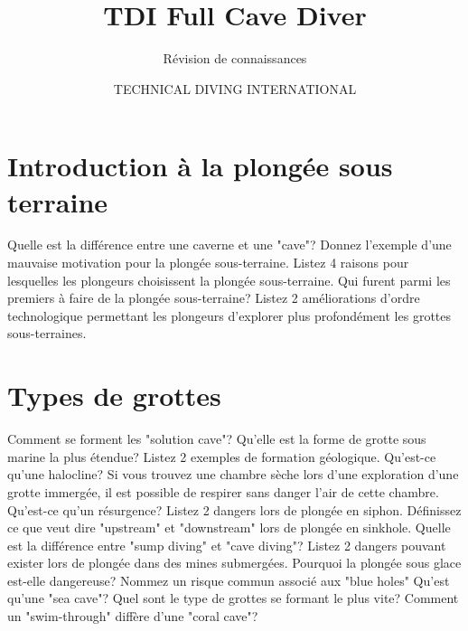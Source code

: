 \documentclass[english,10pt,a4paper]{article}
\title{TDI Full Cave Diver}
\subtitle{Révision de connaissances}
\author{TECHNICAL DIVING INTERNATIONAL}
\begin{document}
	

	\section{Introduction à la plongée sous terraine}

	\begin{outline}
		\1 Quelle est la différence entre une caverne et une "cave"?
		\1 Donnez l’exemple d’une mauvaise motivation pour la plongée sous-terraine.
		\1 Listez 4 raisons pour lesquelles les plongeurs choisissent la plongée sous-terraine.
		\1 Qui furent parmi les premiers à faire de la plongée sous-terraine?
		\1 Listez 2 améliorations d’ordre technologique permettant les plongeurs d’explorer plus profondément les grottes sous-terraines.
	\end{outline}
	\sectionpage	

	\section{Types de grottes}

	\begin{outline}
		\1 Comment se forment les "solution cave"?
		\1 Qu'elle est la forme de grotte sous marine la plus étendue?
		\1 Listez 2 exemples de formation géologique.
		\1 Qu’est-ce qu’une halocline?
		\1 Si vous trouvez une chambre sèche lors d’une exploration d’une grotte immergée, il est possible de respirer sans danger l’air de cette chambre.
		\1 Qu’est-ce qu’un résurgence?
		\1 Listez 2 dangers lors de plongée en siphon.
		\1 Définissez ce que veut dire "upstream" et "downstream" lors de plongée en sinkhole.
		\1 Quelle est la différence entre "sump diving" et "cave diving"?
		\1 Listez 2 dangers pouvant exister lors de plongée dans des mines submergées.
		\1 Pourquoi la plongée sous glace est-elle dangereuse?
		\1 Nommez un risque commun associé aux "blue holes"
		\1 Qu’est qu’une "sea cave"?
		\1 Quel sont le type de grottes se formant le plus vite?
		\1 Comment un "swim-through" diffère d’une "coral cave"?
	\end{outline}
	\sectionpage

\end{document}
